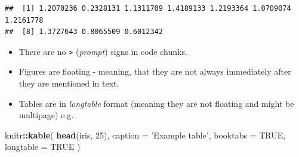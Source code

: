 \documentclass[]{book}
\newenvironment{Shaded}{\begin{snugshade}}{\end{snugshade}}
\newcommand{\KeywordTok}[1]{\textcolor[rgb]{0.13,0.29,0.53}{\textbf{#1}}}
\newcommand{\DataTypeTok}[1]{\textcolor[rgb]{0.13,0.29,0.53}{#1}}
\newcommand{\DecValTok}[1]{\textcolor[rgb]{0.00,0.00,0.81}{#1}}
\newcommand{\StringTok}[1]{\textcolor[rgb]{0.31,0.60,0.02}{#1}}
\newcommand{\OtherTok}[1]{\textcolor[rgb]{0.56,0.35,0.01}{#1}}
\newcommand{\OperatorTok}[1]{\textcolor[rgb]{0.81,0.36,0.00}{\textbf{#1}}}
\newcommand{\NormalTok}[1]{#1}
\providecommand{\tightlist}{%
  \setlength{\itemsep}{0pt}\setlength{\parskip}{0pt}}
\theoremstyle{definition}
\theoremstyle{definition}
\theoremstyle{definition}
\theoremstyle{remark}
\begin{document}
\begin{verbatim}
##  [1] 1.2070236 0.2328131 1.1311709 1.4189133 1.2193364 1.0709074 1.2161778
##  [8] 1.3727643 0.8065509 0.6012342
\end{verbatim}

\begin{itemize}
\tightlist
\item
  There are no \texttt{\textgreater{}} (\emph{prompt}) signs in code
  chunks.
\item
  Figures are floating - meaning, that they are not always immediately
  after they are mentioned in text.
\item
  Tables are in \emph{longtable} format (meaning they are not floating
  and might be multipage) e.g.
\end{itemize}

\begin{Shaded}
\begin{Highlighting}[]
\NormalTok{knitr}\OperatorTok{::}\KeywordTok{kable}\NormalTok{(}
  \KeywordTok{head}\NormalTok{(iris, }\DecValTok{25}\NormalTok{), }\DataTypeTok{caption =} \StringTok{'Example table'}\NormalTok{,}
  \DataTypeTok{booktabs =} \OtherTok{TRUE}\NormalTok{, }\DataTypeTok{longtable =} \OtherTok{TRUE}
\NormalTok{)}
\end{Highlighting}
\end{Shaded}
\end{document}
